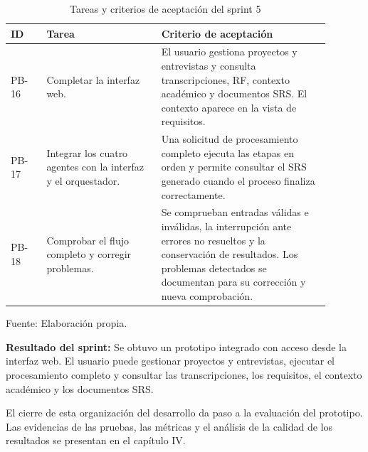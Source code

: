 \begin{table}[H]
    \centering
    \caption{Tareas y criterios de aceptación del sprint 5}
    \label{tab:sprint-5}
    \begingroup
    \small
    \setlength{\tabcolsep}{5pt}
    \renewcommand{\arraystretch}{1.15}
    \begin{tabular}{
        |>{\raggedright\arraybackslash}p{0.10\linewidth}
        |>{\raggedright\arraybackslash}p{0.32\linewidth}
        |>{\raggedright\arraybackslash}p{0.47\linewidth}|
    }
        \hline
        \textbf{ID} &
        \textbf{Tarea} &
        \textbf{Criterio de aceptación} \\
        \hline
        PB-16 &
        Completar la interfaz web. &
        El usuario gestiona proyectos y entrevistas
        y consulta transcripciones, RF, contexto
        académico y documentos SRS.
        El contexto aparece en la vista de requisitos. \\
        \hline
        PB-17 &
        Integrar los cuatro agentes
        con la interfaz y el orquestador. &
        Una solicitud de procesamiento completo
        ejecuta las etapas en orden y permite
        consultar el SRS generado cuando
        el proceso finaliza correctamente. \\
        \hline
        PB-18 &
        Comprobar el flujo completo
        y corregir problemas. &
        Se comprueban entradas válidas e inválidas,
        la interrupción ante errores no resueltos
        y la conservación de resultados.
        Los problemas detectados se documentan
        para su corrección y nueva comprobación. \\
        \hline
    \end{tabular}

    \par\smallskip
    \begin{minipage}{0.95\linewidth}
        \footnotesize Fuente: Elaboración propia.
    \end{minipage}
    \endgroup
\end{table}

\noindent\textbf{Resultado del sprint:}
Se obtuvo un prototipo integrado con acceso desde
la interfaz web. El usuario puede gestionar proyectos
y entrevistas, ejecutar el procesamiento completo
y consultar las transcripciones, los requisitos,
el contexto académico y los documentos SRS.


El cierre de esta organización del desarrollo
da paso a la evaluación del prototipo.
Las evidencias de las pruebas, las métricas
y el análisis de la calidad de los resultados
se presentan en el capítulo IV.


